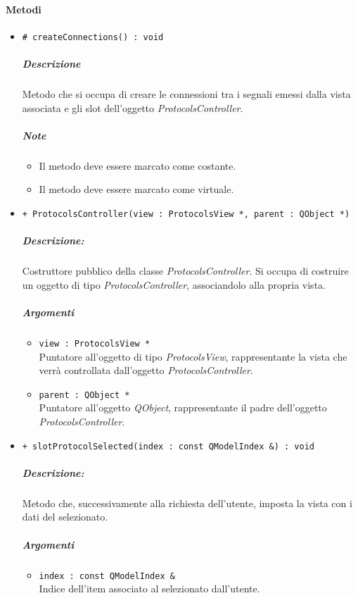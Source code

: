 	\paragraph{\color{black}Metodi}
		\begin{itemize}
			\item \color{blue} \verb!# createConnections() : void!
			\color{black}
			\subparagraph{Descrizione} Metodo che si occupa di creare le connessioni tra i segnali emessi dalla vista associata e gli slot\g{} dell'oggetto \textsl{ProtocolsController}.
			\subparagraph{Note}
			\begin{itemize}
				\item Il metodo deve essere marcato come costante.
				\item Il metodo deve essere marcato come virtuale.
			\end{itemize}
			\item \color{blue} \verb!+ ProtocolsController(view : ProtocolsView *, parent : QObject *)!
			\color{black}
			\subparagraph{Descrizione:} Costruttore pubblico della classe \textsl{ProtocolsController}. Si occupa di costruire un oggetto di tipo \textsl{ProtocolsController}, associandolo alla propria vista.
			\color{black}
			\subparagraph{Argomenti}
			\begin{itemize}
				\item \color{RoyalPurple} \verb!view : ProtocolsView *!\\				
\color{black} Puntatore all'oggetto di tipo \textsl{ProtocolsView}, rappresentante la vista che verrà controllata dall'oggetto \textsl{ProtocolsController}.
				\item \color{RoyalPurple} \verb!parent : QObject *!\\				
\color{black} Puntatore all'oggetto \textsl{QObject}, rappresentante il padre dell'oggetto \textsl{ProtocolsController}.
			\end{itemize}
			\item \color{blue} \verb!+ slotProtocolSelected(index : const QModelIndex &) : void!
			\color{black}
			\subparagraph{Descrizione:} Metodo che, successivamente alla richiesta dell'utente, imposta la vista con i dati del \protocol{} selezionato.
			\color{black}
			\subparagraph{Argomenti}
			\begin{itemize}
				\item \color{RoyalPurple} \verb!index : const QModelIndex &!\\				
\color{black} Indice dell'item associato al \protocol{} selezionato dall'utente.
			\end{itemize}

\end{itemize}
